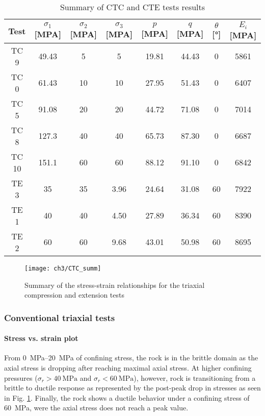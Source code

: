 \begin{table}
    \centering
    \begin{tabular}{cccccccc}
        \hline 
        Test & $\sigma_1$ [\si{MPA}] & $\sigma_2$ [\si{MPA}] &$\sigma_3$ [\si{MPA}] & $p$ [\si{MPA}] & $q$ [\si{MPA}] & $\theta$ [\si{\degree}] & $E_i$ [\si{MPA}] \\
        \hline
        \hline
        TC 9  & 49.43 & 5  & 5    & 19.81 & 44.43 & 0  & 5861  \\ 
        TC 0  & 61.43 & 10 & 10   & 27.95 & 51.43 & 0  & 6407  \\ 
        TC 5  & 91.08 & 20 & 20   & 44.72 & 71.08 & 0  & 7014  \\ 
        TC 8  & 127.3 & 40 & 40   & 65.73 & 87.30 & 0  & 6687  \\ 
        TC 10 & 151.1 & 60 & 60   & 88.12 & 91.10 & 0  & 6842  \\ 
        \hline
        \hline
        TE 3  & 35    & 35 & 3.96 & 24.64 & 31.08 & 60 & 7922  \\ 
        TE 1  & 40    & 40 & 4.50 & 27.89 & 36.34 & 60 & 8390  \\ 
        TE 2  & 60    & 60 & 9.68 & 43.01 & 50.98 & 60 & 8695  \\
        \hline
    \end{tabular}
    \caption{Summary of CTC and CTE tests results}
    \label{tb3:CTC-CTE-results}
\end{table}

\begin{figure}[tb]
    \centering
    \texttt{[image: ch3/CTC\_summ]}
    \caption{Summary of the stress-strain relationships for the triaxial compression and extension tests}
    \label{fig3:8}
\end{figure} 

\subsubsection{Conventional triaxial tests}

\paragraph{Stress vs. strain plot}
From \SIrange{0}{20}{MPa} of confining stress, the rock is in the brittle domain as the axial stress is dropping after reaching maximal axial stress. At higher confining pressures ($\sigma_r > \SI{40}{\mega\pascal}$ and $\sigma_r < \SI{60}{\mega\pascal}$), however, rock is transitioning from a brittle to ductile response as represented by the post-peak drop in stresses as seen in Fig. \ref{fig3:8}. Finally, the rock shows a ductile behavior under a confining stress of \SI{60}{MPa}, were the axial stress does not reach a peak value.

